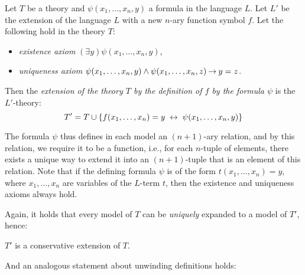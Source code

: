 \begin{definition}
    Let $T$ be a theory and $\psi(x_1,\dots,x_n,y)$ a formula in the language $L$. Let $L'$ be the extension of the language $L$ with a new $n$-ary function symbol $f$. Let the following hold in the theory $T$:
    \begin{itemize}
        \item \emph{existence axiom} $(\exists y)\psi(x_1,\dots,x_n,y)$,
        \item \emph{uniqueness axiom} $\psi(x_1,\dots,x_n,y)\land \psi(x_1,\dots,x_n,z)\mathbin{\rightarrow} y=z$.
    \end{itemize}
    Then the \emph{extension of the theory $T$ by the definition of $f$ by the formula $\psi$} is the $L'$-theory:
    $$T'=T\cup\{f(x_1,\dots,x_n)=y\ \liff\ \psi(x_1,\dots,x_n,y)\}$$
\end{definition}

The formula $\psi$ thus defines in each model an $(n+1)$-ary relation, and by this relation, we require it to be a function, i.e., for each $n$-tuple of elements, there exists a unique way to extend it into an $(n+1)$-tuple that is an element of this relation. Note that if the defining formula $\psi$ is of the form $t(x_1,\dots,x_n)=y$, where $x_1,\dots,x_n$ are variables of the $L$-term $t$, then the existence and uniqueness axioms always hold.

Again, it holds that every model of $T$ can be \emph{uniquely} expanded to a model of $T'$, hence:
\begin{corollary}
    $T'$ is a conservative extension of $T$.
\end{corollary}

And an analogous statement about unwinding definitions holds:

